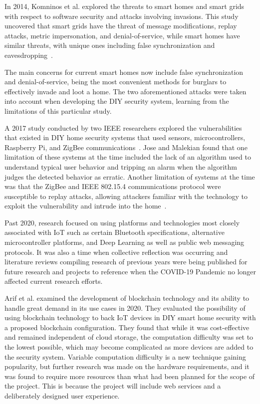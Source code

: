 In 2014, Komninos et al. explored the threats to smart homes and smart grids with respect to
software security and attacks involving invasions. This study uncovered that smart grids have
the threat of message modifications, replay attacks, metric impersonation, and
denial-of-service, while smart homes have similar threats, with unique ones including
false synchronization and eavesdropping~\cite{komninosEtAl2014}.

The main concerns for current smart homes now include false synchronization and
denial-of-service, being the most convenient methods for burglars to effectively invade and
loot a home. The two aforementioned attacks were taken into account when developing the DIY
security system, learning from the limitations of this particular study.

A 2017 study conducted by two IEEE researchers explored the vulnerabilities that existed
in DIY home security systems that used sensors, microcontrollers, Raspberry Pi, and ZigBee
communications~\cite{joseMalekian2017}. Jose and Malekian found that one limitation of these
systems at the time included the lack of an algorithm used to understand typical
user behavior and tripping an alarm when the algorithm judges the detected behavior as
erratic. Another limitation of systems at the time was that the ZigBee and IEEE 802.15.4
communications protocol were susceptible to replay attacks, allowing attackers familiar
with the technology to exploit the vulnerability and intrude
into the home~\cite{joseMalekian2017}.

Past 2020, research focused on using platforms and technologies most closely associated with
IoT such as certain Bluetooth specifications, alternative microcontroller platforms, and Deep
Learning as well as public web messaging protocols. It was also a time when collective reflection was occurring and literature reviews compiling research of previous years were being published for future research and projects to reference when the COVID-19 Pandemic no longer affected current research efforts.

Arif et al. examined the development of blockchain technology and its ability to
handle great demand in its use cases in 2020. They evaluated the possibility of using
blockchain technology to back IoT devices in DIY smart home security with a proposed
blockchain configuration. They found that while it was cost-effective and remained
independent of cloud storage, the computation difficulty was set to the lowest possible,
which may become complicated as more devices are added to the security system.
\cite{arifEtAl_2020} Variable computation difficulty is a new technique gaining popularity,
but further research was made on the hardware requirements, and it was found to require more
resources than what had been planned for the scope of the project. This is because the
project will include web services and a deliberately designed user experience.

